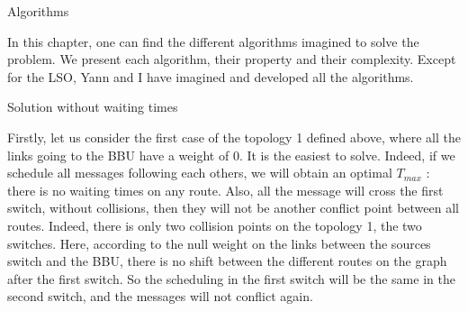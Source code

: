 \documentclass[a4paper,10pt]{report}
\begin{document}
\begin{chapter}{Algorithms}

In this chapter, one can find the different algorithms imagined to solve the problem. We present each algorithm, their property and their complexity.
Except for the LSO, Yann and I have imagined and developed all the algorithms.

\begin{section}{Solution without waiting times}

Firstly, let us consider the first case of the topology 1 defined above, where all the links going to the BBU
have a weight of 0. It is the easiest to solve. 
Indeed, if we schedule all messages following each others, we will obtain an optimal
$T_{max}$ : there is no waiting times on any route.
Also, all the message will cross the first switch, without collisions, then 
they will not be another conflict point between all routes.
Indeed, there is only two collision points on the topology 1, the two switches.
Here, according to the null weight on the links between the sources switch and the BBU,
there is no shift between the different routes on the graph after the first switch.
So the scheduling in the first switch will be the same in the second switch,
and the messages will not conflict again.\\
 
\end{section}
\end{chapter}
\end{document}
